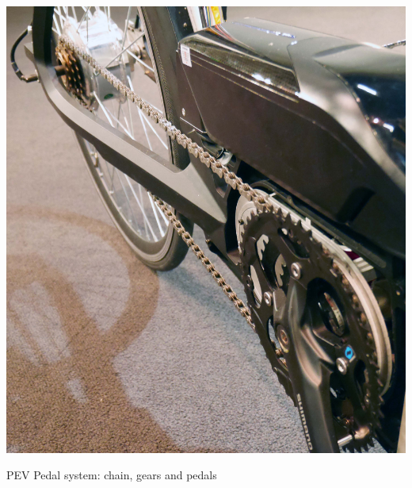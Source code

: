 \begin{marginfigure}[-6cm]
	\includegraphics[width=1\linewidth]{figs/05/P1050742}
	\caption{PEV Pedal system: chain, gears and pedals}
\end{marginfigure}

\newpage
